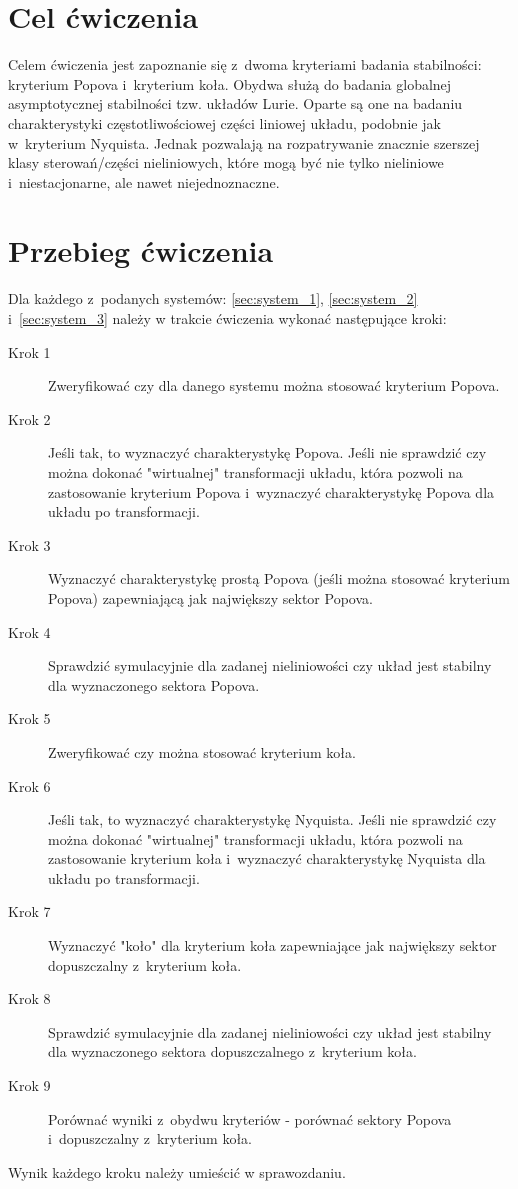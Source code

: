 \documentclass{sprawozdanie-agh}
\begin{document}

\stronatytulowa{}
\section{Cel ćwiczenia}
Celem ćwiczenia jest zapoznanie się z~dwoma kryteriami badania stabilności: kryterium Popova i~kryterium koła.
Obydwa służą do badania globalnej asymptotycznej stabilności tzw. układów Lurie.
Oparte są one na badaniu charakterystyki częstotliwościowej części liniowej
układu, podobnie jak w~kryterium Nyquista.
Jednak pozwalają na rozpatrywanie znacznie szerszej klasy sterowań/części nieliniowych, które mogą być nie tylko nieliniowe i~niestacjonarne, ale nawet niejednoznaczne.

\section{Przebieg ćwiczenia}
Dla każdego z~podanych systemów: \ref{sec:system_1}, \ref{sec:system_2}
i~\ref{sec:system_3} należy w trakcie ćwiczenia wykonać następujące kroki:
\begin{description}
    \item [Krok 1] Zweryfikować czy dla danego systemu można stosować kryterium Popova.
    \item [Krok 2] Jeśli tak, to wyznaczyć charakterystykę Popova. Jeśli nie
    sprawdzić czy można dokonać "wirtualnej" transformacji układu, która pozwoli
    na zastosowanie kryterium Popova i~wyznaczyć charakterystykę Popova dla
    układu po transformacji.
    \item [Krok 3] Wyznaczyć charakterystykę prostą Popova (jeśli można stosować
    kryterium Popova) zapewniającą jak największy sektor Popova.
    \item [Krok 4] Sprawdzić symulacyjnie dla zadanej nieliniowości czy układ
    jest stabilny dla wyznaczonego sektora Popova.
    \item [Krok 5] Zweryfikować czy można stosować kryterium koła.
    \item [Krok 6] Jeśli tak, to wyznaczyć charakterystykę Nyquista. Jeśli nie
    sprawdzić czy można dokonać "wirtualnej" transformacji układu, która pozwoli
    na zastosowanie kryterium koła i~wyznaczyć charakterystykę Nyquista dla
    układu po transformacji.
    \item [Krok 7] Wyznaczyć "koło" dla kryterium koła zapewniające jak
    największy sektor dopuszczalny z~kryterium koła.
    \item [Krok 8] Sprawdzić symulacyjnie dla zadanej nieliniowości czy układ
    jest stabilny dla wyznaczonego sektora dopuszczalnego z~kryterium koła.
    \item [Krok 9] Porównać wyniki z~obydwu kryteriów - porównać sektory Popova
    i~dopuszczalny z~kryterium koła.
\end{description}
Wynik każdego kroku należy umieścić w sprawozdaniu.
\end{document}
